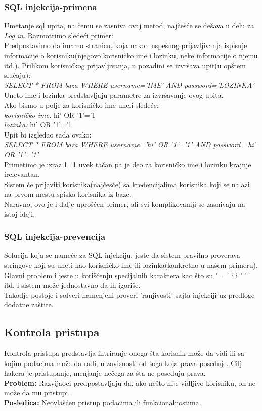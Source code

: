 \documentclass[a4paper]{article}
\begin{document}
\subsubsection{SQL injekcija-primena}
Umetanje sql upita, na \v{c}emu se zasniva ovaj metod, naj\v{c}e\v{s}\'{c}e se de\v{s}ava u delu za \textit{Log in}. Razmotrimo slede\'{c}i primer:\\
Predpostavimo da imamo stranicu, koja nakon uspe\v{s}nog prijavljivanja ispisuje informacije o korisniku(njegovo korisni\v{c}ko ime i lozinku, neke informacije o njemu itd.). Prilikom korisni\v{c}kog prijavljivanja, u pozadini se izvr\v{s}ava upit(u op\v{s}tem slu\v{c}aju): \\\textit{SELECT * FROM baza WHERE username='IME' AND password='LOZINKA'}\\
Uneto ime i lozinka predstavljaju parametre za izvr\v{s}avanje ovog upita.\\
Ako bismo u polje za korisni\v{c}ko ime uneli slede\'{c}e:\\
\textit{korisni\v{c}ko ime:} hi' OR '1'='1\\
\textit{lozinka:} hi' OR '1'='1\\
Upit bi izgledao sada ovako:\\
\textit{SELECT * FROM baza WHERE username='hi' OR '1'='1' AND password='hi' OR '1'='1'}\\
Primetimo je izraz 1=1 uvek ta\v{c}an pa je deo za korisni\v{c}ko ime i lozinku krajnje irelevantan.\\
Sistem \'{c}e prijaviti korisnika(naj\v{c}es\'{c}e) sa kredencijalima korisnika koji se nalazi na prvom mestu spiska korisnika iz baze.\\
Naravno, ovo je i dalje upro\v{s}\'{c}en primer, ali svi komplikovaniji se zasnivaju na istoj ideji.
\subsubsection{SQL injekcija-prevencija}
Solucija koja se name\'{c}e za SQL injekciju, jeste da sistem pravilno proverava stringove koji su uneti kao korisni\v{c}ko ime ili lozinka(konkretno u na\v{s}em primeru). Glavni problem i jeste u kori\v{s}\'{c}enju specijalnih karaktera kao \v{s}to su ' = ' ili ' ' ' itd. i sistem mo\v{z}e jednostavno da ih igori\v{s}e.\\
Takodje postoje i sofveri namenjeni proveri 'ranjivosti' sajta injekciji uz predloge dodatne za\v{s}tite.
\subsection{Kontrola pristupa}
Kontrola pristupa predstavlja filtriranje onoga \v{s}ta korisnik mo\v{z}e da vidi ili sa kojim podacima mo\v{z}e da radi,  u zavisnosti od toga koja prava poseduje. Cilj hakera je pristupanje, menjanje ne\v{c}ega za \v{s}ta ne poseduju prava.\\
\textbf{Problem:} Razvijaoci predpostavljaju da, ako ne\v{s}to nije vidljivo korisniku, on ne mo\v{z}e da mu pristupi.\\
\textbf{Posledica:} Neovla\v{s}\'{c}en pristup podacima ili funkcionalnostima.
\end{document}
